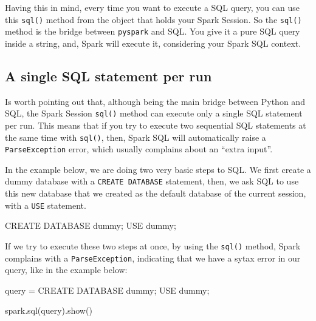 \documentclass[
  11pt,
  letterpaper,
  DIV=11,
  numbers=noendperiod]{scrreprt}
\newenvironment{Shaded}{\begin{snugshade}}{\end{snugshade}}
\newcommand{\KeywordTok}[1]{\textcolor[rgb]{0.00,0.23,0.31}{#1}}
\newcommand{\NormalTok}[1]{\textcolor[rgb]{0.00,0.23,0.31}{#1}}
\newcommand{\OperatorTok}[1]{\textcolor[rgb]{0.37,0.37,0.37}{#1}}
\newcommand{\StringTok}[1]{\textcolor[rgb]{0.13,0.47,0.30}{#1}}
\begin{document}
Having this in mind, every time you want to execute a SQL query, you can
use this \texttt{sql()} method from the object that holds your Spark
Session. So the \texttt{sql()} method is the bridge between
\texttt{pyspark} and SQL. You give it a pure SQL query inside a string,
and, Spark will execute it, considering your Spark SQL context.

\hypertarget{a-single-sql-statement-per-run}{%
\subsection{A single SQL statement per
run}\label{a-single-sql-statement-per-run}}

Is worth pointing out that, although being the main bridge between
Python and SQL, the Spark Session \texttt{sql()} method can execute only
a single SQL statement per run. This means that if you try to execute
two sequential SQL statements at the same time with \texttt{sql()},
then, Spark SQL will automatically raise a \texttt{ParseException}
error, which usually complains about an ``extra input''.

In the example below, we are doing two very basic steps to SQL. We first
create a dummy database with a \texttt{CREATE\ DATABASE} statement,
then, we ask SQL to use this new database that we created as the default
database of the current session, with a \texttt{USE} statement.

\begin{Shaded}
\begin{Highlighting}[]
\KeywordTok{CREATE} \KeywordTok{DATABASE}\NormalTok{ \textasciigrave{}dummy\textasciigrave{};}
\KeywordTok{USE}\NormalTok{ \textasciigrave{}dummy\textasciigrave{};}
\end{Highlighting}
\end{Shaded}

If we try to execute these two steps at once, by using the
\texttt{sql()} method, Spark complains with a \texttt{ParseException},
indicating that we have a sytax error in our query, like in the example
below:

\begin{Shaded}
\begin{Highlighting}[]
\NormalTok{query }\OperatorTok{=} \StringTok{\textquotesingle{}\textquotesingle{}\textquotesingle{}}
\StringTok{CREATE DATABASE \textasciigrave{}dummy\textasciigrave{};}
\StringTok{USE \textasciigrave{}dummy\textasciigrave{};}
\StringTok{\textquotesingle{}\textquotesingle{}\textquotesingle{}}

\NormalTok{spark.sql(query).show()}
\end{Highlighting}
\end{Shaded}
\end{document}
